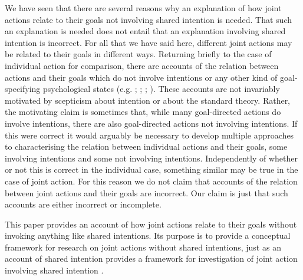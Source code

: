 \documentclass[12pt,a4paper]{extarticle}
\begin{document}
We have seen that there are several reasons why an explanation of how joint actions relate to their goals not involving shared intention is needed.  
That such an explanation is needed does not entail that an explanation involving shared intention is incorrect.  For all that we have said here, different joint actions may be related to their goals in different ways.  
Returning briefly to the case of individual action for comparison, there are accounts of the relation between actions and their goals which do not involve intentions or any other kind of goal-specifying psychological states
(e.g.
	\citealp{Bennett:1976rg};
	\citealp{Butterfill:2001kc};
	\citealp{Schueler:2003fk};
	\citealp{Taylor:1964tr}).
These accounts are not invariably motivated by scepticism about intention or about the standard theory.  Rather, the motivating claim is sometimes that, while many goal-directed actions do involve intentions, there are also goal-directed actions not involving intentions.  If this were correct it would arguably be necessary to develop multiple approaches to characterising the relation between individual actions and their goals, some involving intentions and some not involving intentions.  Independently of whether or not this is correct in the individual case, something similar may be true in the case of joint action.  For this reason we do not claim that accounts of the relation between joint actions and their goals are incorrect.  Our claim is just that such accounts are either incorrect or incomplete.

This paper provides an account of how joint actions relate to their goals without invoking anything like shared intentions.  
Its purpose is to provide a conceptual framework for research on joint actions without shared intentions, just as an account of shared intention provides a framework for investigation of joint action involving shared intention \citep[p.\ 150]{Bratman:2009lv}.  

\end{document}
